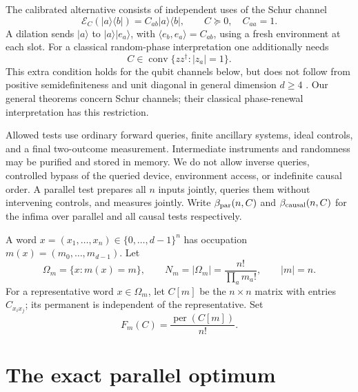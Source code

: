 \documentclass[11pt,a4paper]{article}
\theoremstyle{remark}
\DeclareMathOperator{\per}{per}
\newcommand{\ket}[1]{|#1\rangle}
\newcommand{\bra}[1]{\langle#1|}
\newcommand{\ip}[2]{\langle #1,#2\rangle}
\newcommand{\E}{\mathcal E}
\begin{document}
The calibrated alternative consists of independent uses of the Schur channel
\begin{equation}\label{eq:schur}
 \E_C(\ket a\bra b)=C_{ab}\ket a\bra b,\qquad C\succeq0,\quad C_{aa}=1.
\end{equation}
A dilation sends \(\ket a\) to \(\ket a\ket{e_a}\), with
\(\ip{e_b}{e_a}=C_{ab}\), using a fresh environment at each slot.
For a classical random-phase interpretation one additionally needs
\[
 C\in\operatorname{conv}\{zz^\dagger:|z_a|=1\}.
\]
This extra condition holds for the qubit channels below, but does not
follow from positive semidefiniteness and unit diagonal in general
dimension \(d\geq4\) \cite{dykema}. Our general theorems concern Schur
channels; their classical phase-renewal interpretation has this restriction.

Allowed tests use ordinary forward queries, finite ancillary systems,
ideal controls, and a final two-outcome measurement. Intermediate
instruments and randomness may be purified and stored in memory. We do
not allow inverse queries, controlled bypass of the queried device,
environment access, or indefinite causal order.
A parallel test prepares all \(n\) inputs jointly, queries them without
intervening controls, and measures jointly. Write
\(\beta_{\rm par}(n,C)\) and \(\beta_{\rm causal}(n,C)\) for the infima over
parallel and all causal tests respectively.

A word \(x=(x_1,\ldots,x_n)\in\{0,\ldots,d-1\}^n\) has occupation
\(m(x)=(m_0,\ldots,m_{d-1})\).
Let
\[
 \Omega_m=\{x:m(x)=m\},\qquad N_m=|\Omega_m|
       =\frac{n!}{\prod_a m_a!},\qquad |m|=n.
\]
For a representative word \(x\in\Omega_m\), let \(C[m]\) be the \(n\times n\)
matrix with entries \(C_{x_i x_j}\); its permanent is independent of the
representative. Set
\begin{equation}\label{eq:F}
 F_m(C)=\frac{\per(C[m])}{n!}.
\end{equation}

\section{The exact parallel optimum}
\end{document}

